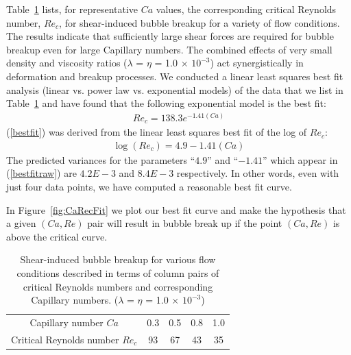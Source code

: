 \documentclass[%
 reprint,
 showkeys,
 amsmath,amssymb,
 aps,
 prfluids,
 onecolumn
]{revtex4-2}
\begin{document}
Table~\ref{tab:CaRecComparison} 
lists, for representative $Ca$ values,
the corresponding critical Reynolds number, $Re_{c}$, for shear-induced 
bubble breakup for a variety of flow
conditions.  The results indicate that sufficiently large shear forces are
required for bubble breakup even for large Capillary numbers. The combined
effects of very small density and viscosity ratios 
($\lambda$ = $\eta$ = 1.0 $\times$ $10^{-3}$) 
act synergistically in deformation and breakup processes.
We conducted a linear least squares best fit analysis (linear vs. 
power law vs. exponential models) of the data that we 
list in Table~\ref{tab:CaRecComparison} and have found that the following
exponential model is the best fit:
\begin{eqnarray}
Re_{c}=138.3 e^{-1.41 (Ca)} \label{bestfit}
\end{eqnarray}
(\ref{bestfit}) was derived from the linear least squares best fit
of the log of $Re_{c}$:
\begin{eqnarray}
	\log(Re_{c})=4.9-1.41 (Ca)  \label{bestfitraw}
\end{eqnarray}
The predicted variances for the parameters 
``$4.9$'' and ``$-1.41$'' which appear in (\ref{bestfitraw}) are
$4.2E-3$ and $8.4E-3$ respectively.  In other words, even with just
four data points, we have computed a reasonable best fit curve.

In Figure~\ref{fig:CaRecFit} we plot our best fit curve and make the
hypothesis that a given $(Ca,Re)$ pair will result in bubble break up
if the point $(Ca,Re)$ is above the critical curve.

%
\begin{table}[tbh]
\caption{Shear-induced bubble breakup for various flow 
	conditions described in terms
        of column pairs of critical Reynolds numbers and 
	corresponding Capillary numbers.
        ($\lambda$ = $\eta$ = 1.0 $\times$ $10^{-3}$) 
	}
\label{tab:CaRecComparison}
\footnotesize
\center
\begin{tabular}{ c  c  c  c  c }
\hline
\hline
Capillary number $Ca$            & 0.3  & 0.5  & 0.8  & 1.0  \\
Critical Reynolds number $Re_c$  & 93   & 67   & 43   & 35   \\
\hline
\hline
\end{tabular}
\end{table}
\end{document}
